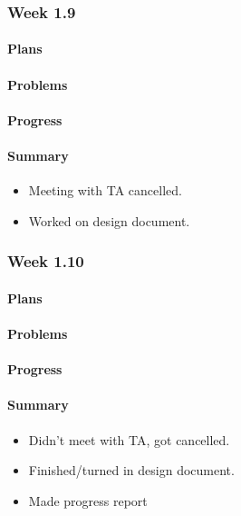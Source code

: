 \documentclass[onecolumn, draftclsnofoot,10pt, compsoc]{article}
\begin{document}
		\subsubsection{Week 1.9}

			\paragraph{Plans} \hfill \break

		    \paragraph{Problems} \hfill \break

		    \paragraph{Progress} \hfill \break

		    \paragraph{Summary} \hfill \break
		    \begin{itemize}
                \item Meeting with TA cancelled.
                \item Worked on design document. \\
		     \end{itemize}
		\subsubsection{Week 1.10}

		    \paragraph{Plans} \hfill \break

		    \paragraph{Problems} \hfill \break

		    \paragraph{Progress} \hfill \break

		    \paragraph{Summary} \hfill \break
		        \begin{itemize}
                    \item Didn't meet with TA, got cancelled.
                    \item Finished/turned in design document.
                    \item Made progress report
                \end{itemize}
\end{document}
